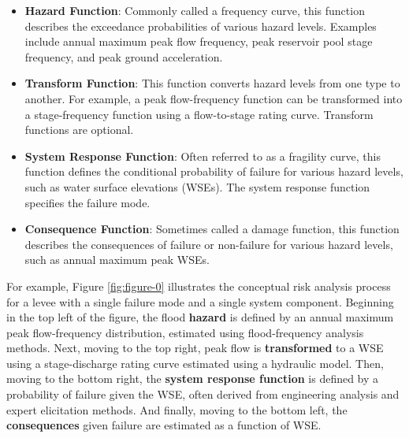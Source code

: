 \documentclass[
]{book}
\begin{document}
\begin{itemize}
\item
  \textbf{Hazard Function}: Commonly called a frequency curve, this function describes the exceedance probabilities of various hazard levels. Examples include annual maximum peak flow frequency, peak reservoir pool stage frequency, and peak ground acceleration.
\item
  \textbf{Transform Function}: This function converts hazard levels from one type to another. For example, a peak flow-frequency function can be transformed into a stage-frequency function using a flow-to-stage rating curve. Transform functions are optional.
\item
  \textbf{System Response Function}: Often referred to as a fragility curve, this function defines the conditional probability of failure for various hazard levels, such as water surface elevations (WSEs). The system response function specifies the failure mode.
\item
  \textbf{Consequence Function}: Sometimes called a damage function, this function describes the consequences of failure or non-failure for various hazard levels, such as annual maximum peak WSEs.
\end{itemize}

For example, Figure \ref{fig:figure-0} illustrates the conceptual risk analysis process for a levee with a single failure mode and a single system component. Beginning in the top left of the figure, the flood \textbf{hazard} is defined by an annual maximum peak flow-frequency distribution, estimated using flood-frequency analysis methods. Next, moving to the top right, peak flow is \textbf{transformed} to a WSE using a stage-discharge rating curve estimated using a hydraulic model. Then, moving to the bottom right, the \textbf{system response function} is defined by a probability of failure given the WSE, often derived from engineering analysis and expert elicitation methods. And finally, moving to the bottom left, the \textbf{consequences} given failure are estimated as a function of WSE.
\end{document}
